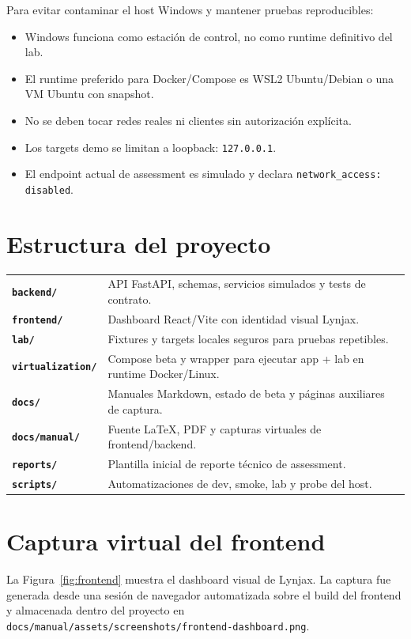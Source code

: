 \documentclass[11pt,letterpaper]{article}
\begin{document}
Para evitar contaminar el host Windows y mantener pruebas reproducibles:

\begin{itemize}
  \item Windows funciona como estación de control, no como runtime definitivo del lab.
  \item El runtime preferido para Docker/Compose es WSL2 Ubuntu/Debian o una VM Ubuntu con snapshot.
  \item No se deben tocar redes reales ni clientes sin autorización explícita.
  \item Los targets demo se limitan a loopback: \texttt{127.0.0.1}.
  \item El endpoint actual de assessment es simulado y declara \texttt{network\_access: disabled}.
\end{itemize}

\section{Estructura del proyecto}

\begin{tabular}{>{\bfseries}p{}p{}}
\texttt{backend/} & API FastAPI, schemas, servicios simulados y tests de contrato.\\
\texttt{frontend/} & Dashboard React/Vite con identidad visual Lynjax.\\
\texttt{lab/} & Fixtures y targets locales seguros para pruebas repetibles.\\
\texttt{virtualization/} & Compose beta y wrapper para ejecutar app + lab en runtime Docker/Linux.\\
\texttt{docs/} & Manuales Markdown, estado de beta y páginas auxiliares de captura.\\
\texttt{docs/manual/} & Fuente LaTeX, PDF y capturas virtuales de frontend/backend.\\
\texttt{reports/} & Plantilla inicial de reporte técnico de assessment.\\
\texttt{scripts/} & Automatizaciones de dev, smoke, lab y probe del host.\\
\end{tabular}

\section{Captura virtual del frontend}

La Figura~\ref{fig:frontend} muestra el dashboard visual de Lynjax. La captura fue generada desde una sesión de navegador automatizada sobre el build del frontend y almacenada dentro del proyecto en \texttt{docs/manual/assets/screenshots/frontend-dashboard.png}.
\end{document}
